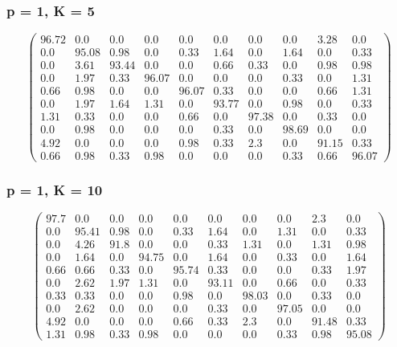 \begin{appendices}
\subsubsection*{p = 1, K = 5}

$$\begin{pmatrix}
96.72&0.0&0.0&0.0&0.0&0.0&0.0&0.0&3.28&0.0\\
0.0&95.08&0.98&0.0&0.33&1.64&0.0&1.64&0.0&0.33\\
0.0&3.61&93.44&0.0&0.0&0.66&0.33&0.0&0.98&0.98\\
0.0&1.97&0.33&96.07&0.0&0.0&0.0&0.33&0.0&1.31\\
0.66&0.98&0.0&0.0&96.07&0.33&0.0&0.0&0.66&1.31\\
0.0&1.97&1.64&1.31&0.0&93.77&0.0&0.98&0.0&0.33\\
1.31&0.33&0.0&0.0&0.66&0.0&97.38&0.0&0.33&0.0\\
0.0&0.98&0.0&0.0&0.0&0.33&0.0&98.69&0.0&0.0\\
4.92&0.0&0.0&0.0&0.98&0.33&2.3&0.0&91.15&0.33\\
0.66&0.98&0.33&0.98&0.0&0.0&0.0&0.33&0.66&96.07
\end{pmatrix}$$

\subsubsection*{p = 1, K = 10}
$$\begin{pmatrix}
97.7&0.0&0.0&0.0&0.0&0.0&0.0&0.0&2.3&0.0\\
0.0&95.41&0.98&0.0&0.33&1.64&0.0&1.31&0.0&0.33\\
0.0&4.26&91.8&0.0&0.0&0.33&1.31&0.0&1.31&0.98\\
0.0&1.64&0.0&94.75&0.0&1.64&0.0&0.33&0.0&1.64\\
0.66&0.66&0.33&0.0&95.74&0.33&0.0&0.0&0.33&1.97\\
0.0&2.62&1.97&1.31&0.0&93.11&0.0&0.66&0.0&0.33\\
0.33&0.33&0.0&0.0&0.98&0.0&98.03&0.0&0.33&0.0\\
0.0&2.62&0.0&0.0&0.0&0.33&0.0&97.05&0.0&0.0\\
4.92&0.0&0.0&0.0&0.66&0.33&2.3&0.0&91.48&0.33\\
1.31&0.98&0.33&0.98&0.0&0.0&0.0&0.33&0.98&95.08
\end{pmatrix}$$


\end{appendices}
